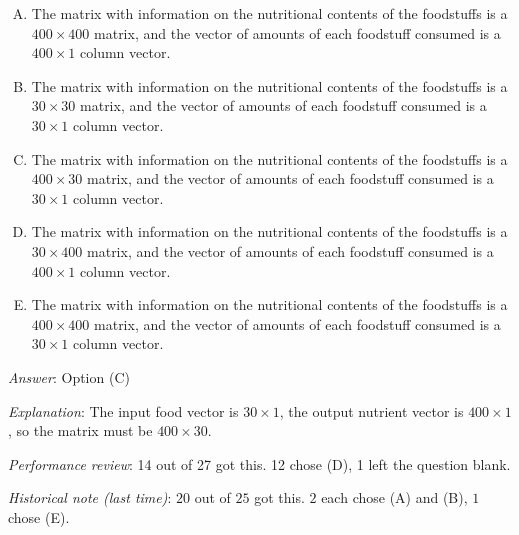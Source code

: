 \documentclass[10pt]{amsart}
\begin{document}
\begin{enumerate}
  \begin{enumerate}[(A)]
  \item The matrix with information on the nutritional contents of the
    foodstuffs is a $400 \times 400$ matrix, and the vector of amounts
    of each foodstuff consumed is a $400 \times 1$ column vector.
  \item The matrix with information on the nutritional contents of the
    foodstuffs is a $30 \times 30$ matrix, and the vector of amounts
    of each foodstuff consumed is a $30 \times 1$ column vector.
  \item The matrix with information on the nutritional contents of the
    foodstuffs is a $400 \times 30$ matrix, and the vector of amounts
    of each foodstuff consumed is a $30 \times 1$ column vector.
  \item The matrix with information on the nutritional contents of the
    foodstuffs is a $30 \times 400$ matrix, and the vector of amounts
    of each foodstuff consumed is a $400 \times 1$ column vector.
  \item The matrix with information on the nutritional contents of the
    foodstuffs is a $400 \times 400$ matrix, and the vector of amounts
    of each foodstuff consumed is a $30 \times 1$ column vector.
  \end{enumerate}

  {\em Answer}: Option (C)

  {\em Explanation}: The input food vector is $30 \times 1$, the
  output nutrient vector is $400 \times 1$, so the matrix must be $400
  \times 30$.

  {\em Performance review}: 14 out of 27 got this. 12 chose (D), 1
  left the question blank.

  {\em Historical note (last time)}: $20$ out of $25$ got this. $2$
  each chose (A) and (B), $1$ chose (E).
\end{enumerate}
\end{document}
